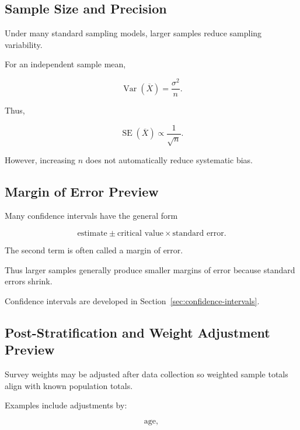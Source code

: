 \subsection{Sample Size and Precision}
\label{subsec:sample-size-precision}

Under many standard sampling models, larger samples reduce sampling
variability.

For an independent sample mean,

\[
\operatorname{Var}(\overline{X})
=
\frac{\sigma^2}{n}.
\]

Thus,

\[
\boxed{
\operatorname{SE}(\overline{X})
\propto
\frac1{\sqrt{n}}.
}
\]

However, increasing \(n\) does not automatically reduce systematic
bias.

\subsection{Margin of Error Preview}
\label{subsec:margin-error-preview}

Many confidence intervals have the general form

\[
\boxed{
\text{estimate}
\pm
\text{critical value}
\times
\text{standard error}.
}
\]

The second term is often called a margin of error.

Thus larger samples generally produce smaller margins of error because
standard errors shrink.

Confidence intervals are developed in
Section~\ref{sec:confidence-intervals}.

\subsection{Post-Stratification and Weight Adjustment Preview}
\label{subsec:poststratification-preview}

Survey weights may be adjusted after data collection so weighted sample
totals align with known population totals.

Examples include adjustments by:

\[
\text{age},
\]

